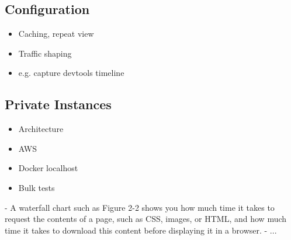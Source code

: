 \subsection{Configuration}


\begin{itemize}
\item Caching, repeat view
\item Traffic shaping
\item e.g. capture devtools timeline
\end{itemize}



\subsection{Private Instances}


\begin{itemize}
\item Architecture
\item AWS
\item Docker localhost
\item Bulk tests
\end{itemize}








- A waterfall chart such as Figure 2-2 shows you how much time it takes to request the contents of a page, such as CSS, images, or HTML, and how much time it takes to download this content before displaying it in a browser.
- ...










